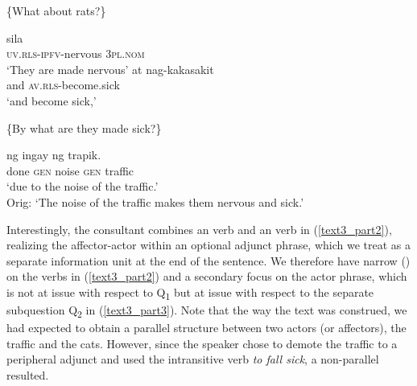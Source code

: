 \documentclass[output=paper,
,modfonts
,nonflat]{langsci/langscibook}
\begin{document}
\begin{exe}
\ex \label{text3_part2}
\begin{xlist}[{>}> A\textsubscript{{0.1}}:]
 \{What about rats?\}
\end{xlist}
\begin{xlist}[{>}{>}> A\textsubscript{{1''}}:]
 {{\ob}sila{\cb}\topic{\cb}\sq}\\
\textsc{\void{[[}uv.rls-ipfv}-nervous \textsc{\void{[}3pl.nom}\\
\glt `They are made nervous'
\gll at {{\ob}{\ob}nag-kakasakit{\cb}\focus{\cb}\sq}\\   
and \textsc{\void{[[}av.rls}-become.sick\\
\glt `and become sick,'
\end{xlist}
\end{exe}

\begin{exe}
\ex \label{text3_part3}
\begin{xlist}[{>}{>}> A\textsubscript{{1''}}:]
 \{By what are they made sick?\}
\end{xlist}
\begin{xlist}[{>}>{>}> A\textsubscript{2}:]
 ng ingay ng {trapik{\cb}\focus{\cb}\sq}.\\
{\void{[[}done} \textsc{gen} noise \textsc{gen} traffic\\
\glt `due to the noise of the traffic.'\\
Orig: `The noise of the traffic makes them nervous and sick.’
\end{xlist}
\end{exe}

\noindent Interestingly, the consultant combines an  verb and an  verb in (\ref{text3_part2}), realizing the affector-actor within an optional adjunct phrase, which we treat as a separate information unit at the end of the sentence. We therefore have narrow ()  on the verbs in (\ref{text3_part2}) and a secondary focus on the actor phrase, which is not at issue with respect to Q\textsubscript{1} but at issue with respect to the separate subquestion Q\textsubscript{2} in (\ref{text3_part3}). Note that the way the text was construed, we had expected to obtain a parallel structure between two actors (or affectors), the traffic and the cats. However, since the speaker chose to demote the traffic to a peripheral adjunct and used the intransitive verb \textit{to fall sick}, a non-parallel  resulted. 
\end{document}
